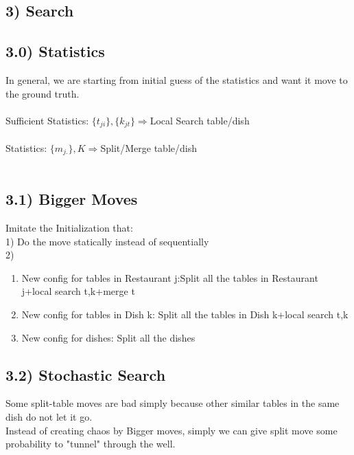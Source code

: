 \documentclass{article}
\begin{document}
\begin{spacing}{1.1}
\section{3) Search}
\subsection{3.0) Statistics}
In general, we are starting from initial guess of the statistics and want it move to the ground truth.\\ \\
Sufficient Statistics: $\{t_{ji}\},\{k_{jt}\}\Longrightarrow$Local Search table/dish\\ \\
Statistics: $\{m_{j.}\},K\Longrightarrow$Split/Merge table/dish\\ \\
\subsection{3.1) Bigger Moves}
Imitate the Initialization that:\\
1) Do the move statically instead of sequentially\\
2) 
\begin{enumerate}
\item New config for tables in Restaurant j:Split all the tables in Restaurant j+local search t,k+merge t
\item New config for tables in Dish k: Split all the tables in Dish k+local search t,k
\item New config for dishes: Split all the dishes
\end{enumerate}
\subsection{3.2) Stochastic Search}
Some split-table moves are bad simply because other similar tables in the same dish do not let it go.\\
Instead of creating chaos by Bigger moves, simply we can give split move some probability to "tunnel" through the well.\\
\end{spacing}
\end{document}
